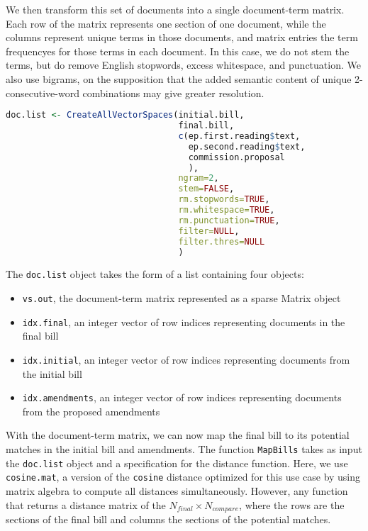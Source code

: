 \documentclass[11pt]{article}
\begin{document}
We then transform this set of documents into a single document-term
matrix. Each row of the matrix represents one section of one document,
while the columns represent unique terms in those documents, and
matrix entries the term frequencyes for those terms in each
document. In this case, we do not stem the terms, but do remove
English stopwords, excess whitespace, and punctuation. We also use
bigrams, on the supposition that the added semantic content of unique
2-consecutive-word combinations may give greater resolution.

\begin{lstlisting}[language=R, numbers=none]
doc.list <- CreateAllVectorSpaces(initial.bill,
                                  final.bill,
                                  c(ep.first.reading$text,
                                    ep.second.reading$text,
                                    commission.proposal
                                    ),
                                  ngram=2,
                                  stem=FALSE,
                                  rm.stopwords=TRUE,
                                  rm.whitespace=TRUE,
                                  rm.punctuation=TRUE,
                                  filter=NULL,
                                  filter.thres=NULL
                                  )

\end{lstlisting}

The \texttt{doc.list} object takes the form of a list containing four
objects:
\begin{itemize}
\item \texttt{vs.out}, the document-term matrix represented as a
  sparse Matrix object
\item \texttt{idx.final}, an integer vector of row indices
  representing documents in the final bill
\item \texttt{idx.initial}, an integer vector of row indices
  representing documents from the initial bill
\item \texttt{idx.amendments}, an integer vector of row indices
  representing documents from the proposed amendments
\end{itemize} 

With the document-term matrix, we can now map the final bill to its
potential matches in the initial bill and amendments. The function
\texttt{MapBills} takes as input the \texttt{doc.list} object and a
specification for the distance function. Here, we use
\texttt{cosine.mat}, a version of the \texttt{cosine} distance
optimized for this use case by using matrix algebra to compute all
distances simultaneously. However, any function that returns a
distance matrix of the $N_{final} \times N_{compare}$, where the rows
are the sections of the final bill and columns the sections of the
potential matches. 
\end{document}
